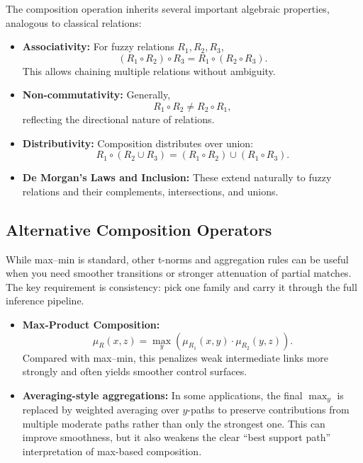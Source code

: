 The composition operation inherits several important algebraic properties, analogous to classical relations:

\begin{itemize}
    \item \textbf{Associativity:} For fuzzy relations \(R_1, R_2, R_3\),
    \[
    (R_1 \circ R_2) \circ R_3 = R_1 \circ (R_2 \circ R_3).
    \]
    This allows chaining multiple relations without ambiguity.

    \item \textbf{Non-commutativity:} Generally,
    \[
    R_1 \circ R_2 \neq R_2 \circ R_1,
    \]
    reflecting the directional nature of relations.

    \item \textbf{Distributivity:} Composition distributes over union:
    \[
    R_1 \circ (R_2 \cup R_3) = (R_1 \circ R_2) \cup (R_1 \circ R_3).
    \]

    \item \textbf{De Morgan's Laws and Inclusion:} These extend naturally to fuzzy relations and their complements, intersections, and unions.

\end{itemize}

\subsection{Alternative Composition Operators}
\label{sec:fuzzyrelations_alternative_composition_operators}

While max--min is standard, other t\hyp{}norms and aggregation rules can be useful when you need smoother transitions or stronger attenuation of partial matches. The key requirement is consistency: pick one family and carry it through the full inference pipeline.

\begin{itemize}
    \item \textbf{Max-Product Composition:}
    \begin{equation}
    \mu_R(x, z) = \max_{y} \left( \mu_{R_1}(x, y) \cdot \mu_{R_2}(y, z) \right).
    \label{eq:max_product_composition}
    \end{equation}
    Compared with max--min, this penalizes weak intermediate links more strongly and often yields smoother control surfaces.

    \item \textbf{Averaging-style aggregations:} In some applications, the final \(\max_y\) is replaced by weighted averaging over \(y\)-paths to preserve contributions from multiple moderate paths rather than only the strongest one.
    This can improve smoothness, but it also weakens the clear ``best support path'' interpretation of max-based composition.

\end{itemize}

